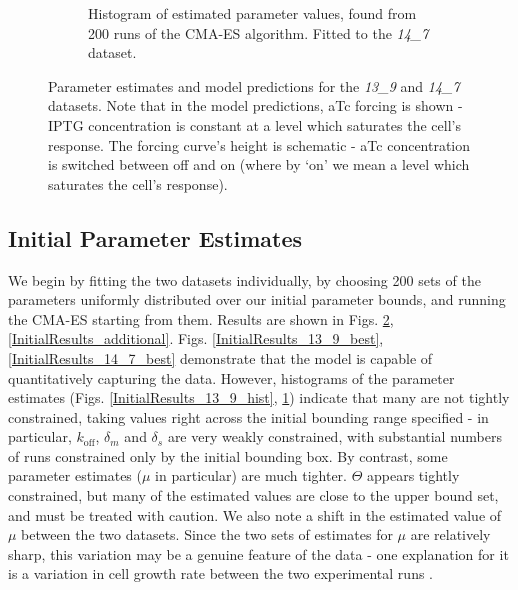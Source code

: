 \documentclass[10pt,journal]{./IEEE_latex_class/IEEEtran}
\begin{document}
\begin{figure}
\begin{subfigure}[c]{0.49\textwidth}
        \caption{Histogram of estimated parameter values, found from 200 runs of the CMA-ES algorithm. Fitted to the \textit{14\_7} dataset. }
        \label{InitialResults_14_7_hist}
    \end{subfigure}
    \caption{Parameter estimates and model predictions for the \textit{13\_9} and \textit{14\_7} datasets. Note that in the model predictions, aTc forcing is shown - IPTG concentration is constant at a level which saturates the cell's response. The forcing curve's height is schematic - aTc concentration is switched between off and on (where by `on' we mean a level which saturates the cell's response).}
\label{InitialResults}
\vspace{-5mm}
\end{figure} 
 


\subsection{Initial Parameter Estimates}
\label{Initial Parameter Estimates}


 We begin by fitting the two datasets individually, by choosing 200 sets of the parameters uniformly distributed over our initial parameter bounds, and running the CMA-ES starting from them. Results are shown in Figs. \ref{InitialResults}, \ref{InitialResults_additional}. Figs. \ref{InitialResults_13_9_best}, \ref{InitialResults_14_7_best}  demonstrate that the model is capable of quantitatively capturing the data. However, histograms of the parameter estimates (Figs. \ref{InitialResults_13_9_hist}, \ref{InitialResults_14_7_hist}) indicate that many are not tightly constrained, taking values right across the initial bounding range specified - in particular, $k_\mathrm{off}$, $\delta_{m}$ and $\delta_{s}$ are very weakly constrained, with substantial numbers of runs constrained only by the initial bounding box. By contrast, some parameter estimates ($\mu$ in particular) are much tighter. $\Theta$ appears tightly constrained, but many of the estimated values are close to the upper bound set, and must be treated with caution. We also note a shift in the estimated value of $\mu$ between the two datasets. Since the two sets of estimates for $\mu$ are relatively sharp, this variation may be a genuine feature of the data - one explanation for it is a variation in cell growth rate between the two experimental runs \cite{Hu2015}.
 
\end{document}
